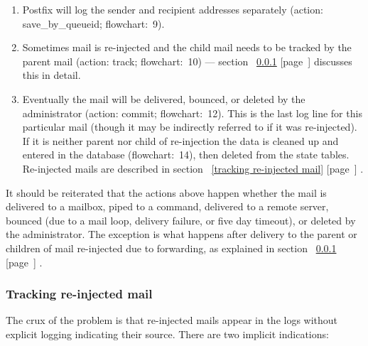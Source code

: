 \documentclass[a4paper,12pt,draft]{article}
\newcommand{\refwithpage}[1]{%
    \empty{}\ref{#1} [page~\pageref{#1}]%
}
\begin{document}
\begin{enumerate}

    \item Postfix will log the sender and recipient addresses separately
        (action: save\_by\_queueid; flowchart:~9).

    \item Sometimes mail is re-injected and the child mail needs to be
        tracked by the parent mail (action: track; flowchart:~10) ---
        section~\refwithpage{tracking re-injected mail} discusses this in
        detail.

    \item Eventually the mail will be delivered, bounced, or deleted by the
        administrator (action: commit; flowchart:~12).  This is the last
        log line for this particular mail (though it may be indirectly
        referred to if it was re-injected).  If it is neither parent nor
        child of re-injection the data is cleaned up and entered in the
        database (flowchart:~14), then deleted from the state tables.
        Re-injected mails are described in section~\refwithpage{tracking
        re-injected mail}.

\end{enumerate}

It should be reiterated that the actions above happen whether the mail is
delivered to a mailbox, piped to a command, delivered to a remote server,
bounced (due to a mail loop, delivery failure, or five day timeout), or
deleted by the administrator.  The exception is what happens after delivery
to the parent or children of mail re-injected due to forwarding, as
explained in section~\refwithpage{tracking re-injected mail}.

\subsubsection{Tracking re-injected mail}

\label{tracking re-injected mail}

The crux of the problem is that re-injected mails appear in the logs
without explicit logging indicating their source.  There are two implicit
indications:
\end{document}

